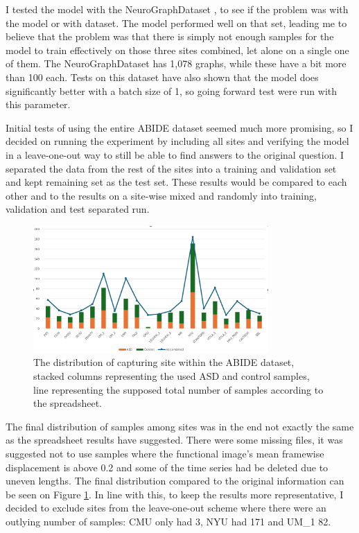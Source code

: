 	I tested the model with the NeuroGraphDataset \cite{said2023neurograph}, to see if the problem was with the model or with dataset. The model performed well on that set, leading me to believe that the problem was that there is simply not enough samples for the model to train effectively on those three sites combined, let alone on a single one of them. The NeuroGraphDataset has 1,078 graphs, while these have a bit more than 100 each. Tests on this dataset have also shown that the model does significantly better with a batch size of 1, so going forward test were run with this parameter.
	
	Initial tests of using the entire ABIDE dataset seemed much more promising, so I decided on running the experiment by including all sites and verifying the model in a leave-one-out way to still be able to find answers to the original question. I separated the data from the rest of the sites into a training and validation set and kept remaining set as the test set. These results would be compared to each other and to the results on a site-wise mixed and randomly into training, validation and test separated run.
	
	\begin{figure}[!h]
		\centering
		\includegraphics[width=0.8\textwidth]{figures/abide_samples.png}
		\caption{The distribution of capturing site within the ABIDE dataset, stacked columns representing the used ASD and control samples, line representing the supposed total number of samples according to the spreadsheet.}
		\label{fig:final_distribution}
	\end{figure}
	
	The final distribution of samples among sites was in the end not exactly the same as the spreadsheet results have suggested. There were some missing files, it was suggested not to use samples where the functional image's mean framewise displacement is above 0.2 and some of the time series had be deleted due to uneven lengths. The final distribution compared to the original information can be seen on Figure \ref{fig:final_distribution}. In line with this, to keep the results more representative, I decided to exclude sites from the leave-one-out scheme where there were an outlying number of samples: CMU only had 3, NYU had 171 and UM\_1 82.
	

